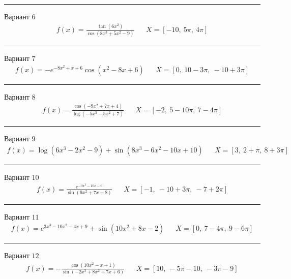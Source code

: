 \documentclass[11pt]{report}
\begin{document}
\begin{center}
    \noindent\rule{8cm}{0.4pt}
\end{center}
Вариант \(6\)
\begin{align*}
    f(x) = \frac{\tan{\left(6 x^{2} \right)}}{\cos{\left(8 x^{3} + 5 x^{2} - 9 \right)}} && X = \left[ -10, \  5 \pi, \  4 \pi\right]
\end{align*}
\begin{center}
    \noindent\rule{8cm}{0.4pt}
\end{center}
Вариант \(7\)
\begin{align*}
    f(x) = - e^{- 8 x^{2} + x + 6} \cos{\left(x^{2} - 8 x + 6 \right)} && X = \left[ 0, \  10 - 3 \pi, \  -10 + 3 \pi\right]
\end{align*}
\begin{center}
    \noindent\rule{8cm}{0.4pt}
\end{center}
Вариант \(8\)
\begin{align*}
    f(x) = \frac{\cos{\left(- 9 x^{2} + 7 x + 4 \right)}}{\log{\left(- 5 x^{3} - 5 x^{2} + 7 \right)}} && X = \left[ -2, \  5 - 10 \pi, \  7 - 4 \pi\right]
\end{align*}
\begin{center}
    \noindent\rule{8cm}{0.4pt}
\end{center}
Вариант \(9\)
\begin{align*}
    f(x) = \log{\left(6 x^{3} - 2 x^{2} - 9 \right)} + \sin{\left(8 x^{3} - 6 x^{2} - 10 x + 10 \right)} && X = \left[ 3, \  2 + \pi, \  8 + 3 \pi\right]
\end{align*}
\begin{center}
    \noindent\rule{8cm}{0.4pt}
\end{center}
Вариант \(10\)
\begin{align*}
    f(x) = \frac{e^{- 9 x^{2} - 10 x - 6}}{\sin{\left(9 x^{2} + 7 x + 8 \right)}} && X = \left[ -1, \  -10 + 3 \pi, \  -7 + 2 \pi\right]
\end{align*}
\begin{center}
    \noindent\rule{8cm}{0.4pt}
\end{center}
Вариант \(11\)
\begin{align*}
    f(x) = e^{3 x^{3} - 10 x^{2} - 4 x + 9} + \sin{\left(10 x^{2} + 8 x - 2 \right)} && X = \left[ 0, \  7 - 4 \pi, \  9 - 6 \pi\right]
\end{align*}
\begin{center}
    \noindent\rule{8cm}{0.4pt}
\end{center}
Вариант \(12\)
\begin{align*}
    f(x) = - \frac{\cos{\left(10 x^{2} - x + 1 \right)}}{\sin{\left(- 2 x^{3} + 8 x^{2} + 7 x + 6 \right)}} && X = \left[ 10, \  - 5 \pi - 10, \  - 3 \pi - 9\right]
\end{align*}
\end{document}

